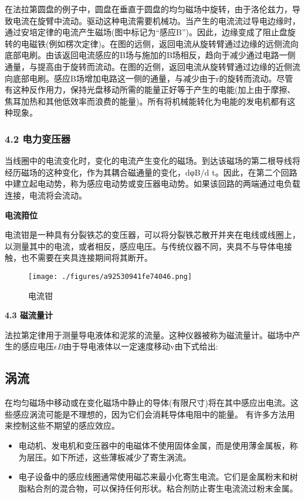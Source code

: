 在法拉第圆盘的例子中，圆盘在垂直于圆盘的均匀磁场中旋转，由于洛伦兹力，导致电流在旋臂中流动。驱动这种电流需要机械功。当产生的电流流过导电边缘时，通过安培定律的电流产生磁场(图中标记为“感应B”)。因此，边缘变成了阻止盘旋转的电磁铁(例如楞次定律)。在图的远侧，返回电流从旋转臂通过边缘的远侧流向底部电刷。由该返回电流感应的B场与施加的B场相反，趋向于减少通过电路一侧通量，与提高由于旋转而流动。在图的近侧，返回电流从旋转臂通过边缘的近侧流向底部电刷。感应B场增加电路这一侧的通量，与减少由于r的旋转而流动。尽管有这种反作用力，保持光盘移动所需的能量正好等于产生的电能(加上由于摩擦、焦耳加热和其他低效率而浪费的能量)。所有将机械能转化为电能的发电机都有这种现象。
\subsubsection{4.2 电力变压器}
当线圈中的电流变化时，变化的电流产生变化的磁场。到达该磁场的第二根导线将经历磁场的这种变化，作为其耦合磁通量的变化，dφB/d t。因此，在第二个回路中建立起电动势，称为感应电动势或变压器电动势。如果该回路的两端通过电负载连接，电流将会流动。

\textbf{电流箝位}

电流钳是一种具有分裂铁芯的变压器，可以将分裂铁芯散开并夹在电线或线圈上，以测量其中的电流，或者相反，感应电压。与传统仪器不同，夹具不与导体电接触，也不需要在夹具连接期间将其断开。
\begin{figure}[ht]
\centering
\texttt{[image: ./figures/a92530941fe74046.png]}
\caption{电流钳} \label{fig_DCGY_8}
\end{figure}

\textbf{4.3 磁流量计}

法拉第定律用于测量导电液体和泥浆的流量。这种仪器被称为磁流量计。磁场中产生的感应电压$\epsilon B$由于导电液体以一定速度移动v由下式给出:
\subsection{涡流}
在均匀磁场中移动或在变化磁场中静止的导体(有限尺寸)将在其中感应出电流。这些感应涡流可能是不理想的，因为它们会消耗导体电阻中的能量。 有许多方法用来控制这些不期望的感应效应。
\begin{itemize}
\item 电动机、发电机和变压器中的电磁体不使用固体金属，而是使用薄金属板，称为层压。如下所述，这些薄板减少了寄生涡流。
\item 电子设备中的感应线圈通常使用磁芯来最小化寄生电流。它们是金属粉末和树脂粘合剂的混合物，可以保持任何形状。粘合剂防止寄生电流流过粉末金属。
\end{itemize}
